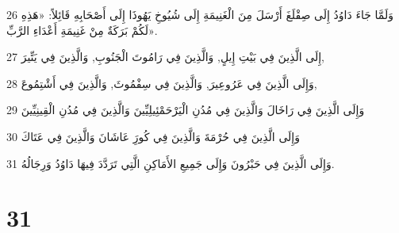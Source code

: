 \par 26 وَلَمَّا جَاءَ دَاوُدُ إِلَى صِقْلَغَ أَرْسَلَ مِنَ الْغَنِيمَةِ إِلَى شُيُوخِ يَهُوذَا إِلَى أَصْحَابِهِ قَائِلاً: «هَذِهِ لَكُمْ بَرَكَةٌ مِنْ غَنِيمَةِ أَعْدَاءِ الرَّبِّ».
\par 27 إِلَى الَّذِينَ فِي بَيْتِ إِيلٍ, وَالَّذِينَ فِي رَامُوتَ الْجَنُوبِ, وَالَّذِينَ فِي يَتِّيرَ,
\par 28 وَإِلَى الَّذِينَ فِي عَرُوعِيرَ, وَالَّذِينَ فِي سِفْمُوثَ, وَالَّذِينَ فِي أَشْتِمُوعَ,
\par 29 وَإِلَى الَّذِينَ فِي رَاخَالَ وَالَّذِينَ فِي مُدُنِ الْيَرْحَمْئِيلِيِّينَ وَالَّذِينَ فِي مُدُنِ الْقِينِيِّينَ
\par 30 وَإِلَى الَّذِينَ فِي حُرْمَةَ وَالَّذِينَ فِي كُورَِ عَاشَانَ وَالَّذِينَ فِي عَتَاكَ
\par 31 وَإِلَى الَّذِينَ فِي حَبْرُونَ وَإِلَى جَمِيعِ الأَمَاكِنِ الَّتِي تَرَدَّدَ فِيهَا دَاوُدُ وَرِجَالُهُ.

\chapter{31}

